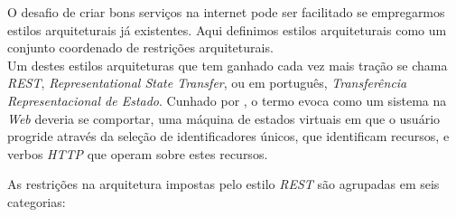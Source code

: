 O desafio de criar bons serviços na internet pode ser facilitado se empregarmos estilos 
arquiteturais já existentes. Aqui definimos estilos arquiteturais como 
um conjunto coordenado de restrições arquiteturais. \\
Um destes estilos arquiteturas que tem ganhado cada vez 
mais tração se chama \emph{REST}, \emph{Representational State Transfer}, ou em português,
\emph{Transferência Representacional de Estado}. Cunhado por , 
o termo evoca como um sistema na \emph{Web} deveria se comportar, uma máquina de estados 
virtuais em que o usuário progride através da seleção de identificadores únicos, que identificam 
recursos, e verbos \emph{HTTP}
que operam sobre estes recursos.

As restrições na arquitetura impostas pelo estilo \emph{REST} são agrupadas em seis categorias:
